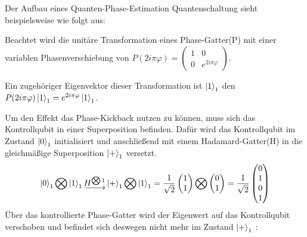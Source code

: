 Der Aufbau eines Quanten-Phase-Estimation Quantenschaltung sieht beispielsweise wie folgt aus:

Beachtet wird die unitäre Transformation eines Phase-Gatter(P) mit einer variablen Phasenverschiebung von 
\(P(2 i \pi \varphi ) = 
\begin{pmatrix}
  1 & 0\\
  0 & e^{2 i \pi \varphi}
\end{pmatrix}\).

Ein zugehöriger Eigenvektor dieser Transformation ist \(\ket{1}_1\) den \(P(2 i \pi \varphi)\ket{1}_1 = e^{2 i \pi \varphi} \ket{1}_1\).

Um den Effekt das Phase-Kickback nutzen zu können, muss sich das Kontrollqubit in einer Superposition befinden.
Dafür wird das Kontrollqubit im Zustand \(\ket{0}_1\) initialisiert und
anschließend mit einem Hadamard-Gatter(H) in die gleichmäßige Superposition \(\ket{+}_1\) versetzt.
\[\ket{0}_1 \operatorname{\bigotimes} \ket{1}_1 
\underrightarrow{H^{\operatorname{\bigotimes}1}}
 \ket{+}_1 \operatorname{\bigotimes} \ket{1}_1
=
\frac{1}{\sqrt{2}}
\begin{pmatrix}
  1 \\
  1
 \end{pmatrix}
 \operatorname{\bigotimes}
 \begin{pmatrix}
  0 \\
  1 
 \end{pmatrix}
 =
 \frac{1}{\sqrt{2}}
 \begin{pmatrix}
  0 \\
  1 \\
  0 \\
  1
\end{pmatrix}
 \]
Über das kontrollierte Phase-Gatter wird der Eigenwert auf das Kontrollqubit verschoben und
befindet sich deswegen nicht mehr im Zustand \(\ket{+}_1\) :
